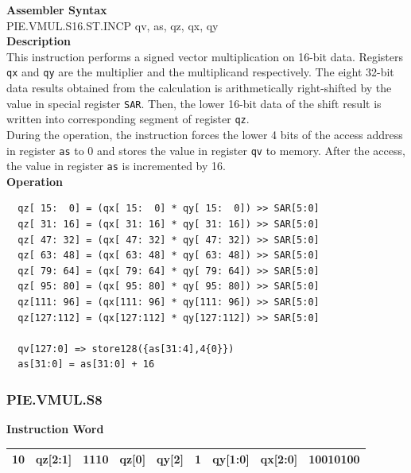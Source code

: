 \textbf{Assembler Syntax} \\
PIE.VMUL.S16.ST.INCP qv, as, qz, qx, qy \\
\textbf{Description} \\
This instruction performs a signed vector multiplication on 16-bit data. Registers \lstinline{qx} and \lstinline{qy} are the multiplier and the multiplicand respectively. The eight 32-bit data results obtained from the calculation is arithmetically right-shifted by the value in special register \lstinline{SAR}. Then, the lower 16-bit data of the shift result is written into corresponding segment of register \lstinline{qz}. \\ During the operation, the instruction forces the lower 4 bits of the access address in register \lstinline{as} to 0 and stores the value in register \lstinline{qv} to memory. After the access, the value in register \lstinline{as} is incremented by 16.\\
\textbf{Operation}
\begin{lstlisting}
  qz[ 15:  0] = (qx[ 15:  0] * qy[ 15:  0]) >> SAR[5:0]
  qz[ 31: 16] = (qx[ 31: 16] * qy[ 31: 16]) >> SAR[5:0]
  qz[ 47: 32] = (qx[ 47: 32] * qy[ 47: 32]) >> SAR[5:0]
  qz[ 63: 48] = (qx[ 63: 48] * qy[ 63: 48]) >> SAR[5:0]
  qz[ 79: 64] = (qx[ 79: 64] * qy[ 79: 64]) >> SAR[5:0]
  qz[ 95: 80] = (qx[ 95: 80] * qy[ 95: 80]) >> SAR[5:0]
  qz[111: 96] = (qx[111: 96] * qy[111: 96]) >> SAR[5:0]
  qz[127:112] = (qx[127:112] * qy[127:112]) >> SAR[5:0]

  qv[127:0] => store128({as[31:4],4{0}})
  as[31:0] = as[31:0] + 16
\end{lstlisting}

\newpage
\subsubsection{PIE.VMUL.S8}\label{instruction:PIEVMULS8}
\setlength\tabcolsep{6pt}
\textbf{Instruction Word} \\
\begin{tabular}{|c|c|c|c|c|c|c|c|c|}
	\hline
	10 & qz[2:1] & 1110 & qz[0] & qy[2] & 1 & qy[1:0] & qx[2:0] & 10010100 \\
	\hline
\end{tabular}

